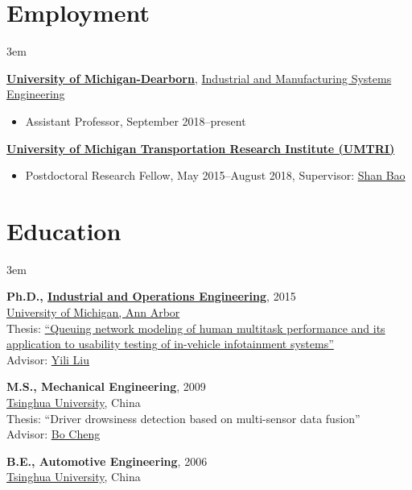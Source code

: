 \documentclass[11pt]{article}
\newenvironment{main}
{\begin{adjustwidth}{3em}{}}
{\end{adjustwidth}}
\begin{document}
\section*{Employment}
\begin{main}

\href{https://umdearborn.edu/}{\textbf{University of Michigan-Dearborn}},
\href{https://umdearborn.edu/cecs/departments/industrial-and-manufacturing-systems-engineering}{Industrial and Manufacturing Systems Engineering}

\begin{itemize}
    \item[] Assistant Professor, September 2018–present
\end{itemize}

\href{http://www.umtri.umich.edu/}{\textbf{University of Michigan Transportation Research Institute (UMTRI)}}

\begin{itemize}
    \item[] Postdoctoral Research Fellow, May 2015–August 2018, Supervisor: \href{https://sites.google.com/umich.edu/hfet-lab/people}{Shan Bao}
\end{itemize}


\end{main}
\section*{Education}
\begin{main}

\textbf{Ph.D., \href{https://ioe.engin.umich.edu/}{Industrial and Operations Engineering}}, 2015\\
\href{https://umich.edu/}{University of Michigan, Ann Arbor}\\
Thesis: \href{https://deepblue.lib.umich.edu/handle/2027.42/113590}{``Queuing network modeling of human multitask performance and its application to usability testing of in-vehicle infotainment systems''}\\
Advisor: \href{https://ioe.engin.umich.edu/people/yili-liu/}{Yili Liu}

\textbf{M.S., Mechanical Engineering}, 2009\\
\href{https://www.tsinghua.edu.cn/en/index.htm}{Tsinghua University}, China\\
Thesis: ``Driver drowsiness detection based on multi-sensor data fusion''\\
Advisor: \href{http://www.svm.tsinghua.edu.cn/essay/80/1799.html}{Bo Cheng}

\textbf{B.E., Automotive Engineering}, 2006\\
\href{https://www.tsinghua.edu.cn/en/index.htm}{Tsinghua University}, China


\end{main}
\end{document}
